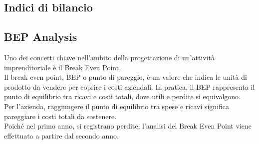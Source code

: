 \documentclass[12pt, a4paper]{article}
\newcommand{\meskip}{\medskip \\}
\begin{document}
\subsection{Indici di bilancio}

\subsection{BEP Analysis}
Uno dei concetti chiave nell'ambito della progettazione di un'attività imprenditoriale è il Break Even Point.\meskip
Il break even point, BEP o punto di pareggio, è un valore che indica le unità di prodotto da vendere per coprire i costi aziendali. In pratica, il BEP rappresenta il punto di equilibrio tra ricavi e costi totali, dove utili e perdite si equivalgono.\meskip
Per l'azienda, raggiungere il punto di equilibrio tra spese e ricavi significa pareggiare i costi totali da sostenere. \meskip
Poiché nel primo anno,  si registrano perdite, l'analisi del Break Even Point viene effettuata a partire dal secondo anno.
\end{document}
